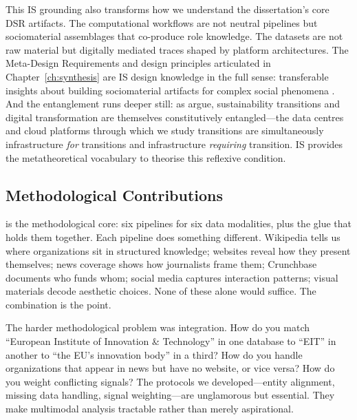 \documentclass[../main.tex]{subfiles}
\begin{document}
This IS grounding also transforms how we understand the dissertation's core DSR artifacts. The computational workflows are not neutral pipelines but sociomaterial assemblages that co-produce role knowledge. The datasets are not raw material but digitally mediated traces shaped by platform architectures. The Meta-Design Requirements and design principles articulated in Chapter~\ref{ch:synthesis} are IS design knowledge in the full sense: transferable insights about building sociomaterial artifacts for complex social phenomena \cite{cecezkecmanovic2014sociomateriality}. And the entanglement runs deeper still: as \textcite{owoyele2025datacentering} argue, sustainability transitions and digital transformation are themselves constitutively entangled---the data centres and cloud platforms through which we study transitions are simultaneously infrastructure \emph{for} transitions and infrastructure \emph{requiring} transition. IS provides the metatheoretical vocabulary to theorise this reflexive condition.

\subsection{Methodological Contributions}

\RoleBox{} is the methodological core: six pipelines for six data modalities, plus the glue that holds them together. Each pipeline does something different. Wikipedia tells us where organizations sit in structured knowledge; websites reveal how they present themselves; news coverage shows how journalists frame them; Crunchbase documents who funds whom; social media captures interaction patterns; visual materials decode aesthetic choices. None of these alone would suffice. The combination is the point.

The harder methodological problem was integration. How do you match ``European Institute of Innovation \& Technology'' in one database to ``EIT'' in another to ``the EU's innovation body'' in a third? How do you handle organizations that appear in news but have no website, or vice versa? How do you weight conflicting signals? The protocols we developed---entity alignment, missing data handling, signal weighting---are unglamorous but essential. They make multimodal analysis tractable rather than merely aspirational.
\end{document}
